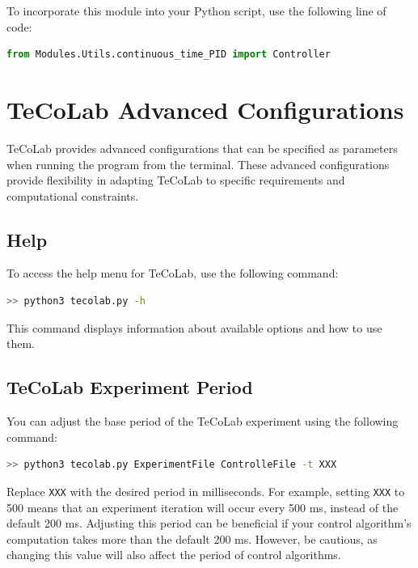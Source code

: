 \documentclass[12pt]{report}
\begin{document}
To incorporate this module into your Python script, use the following line of code:

\begin{lstlisting}[language = Python]
from Modules.Utils.continuous_time_PID import Controller
\end{lstlisting}

\chapter{TeCoLab Advanced Configurations}\label{chap:AdvancedConfigs}

TeCoLab provides advanced configurations that can be specified as parameters when running the program from the terminal. These advanced configurations provide flexibility in adapting TeCoLab to specific requirements and computational constraints.

\section{Help}

To access the help menu for TeCoLab, use the following command:

\begin{lstlisting}[language = bash]
>> python3 tecolab.py -h
\end{lstlisting}

This command displays information about available options and how to use them.

\section{TeCoLab Experiment Period}\label{sec:TeCoLabPeriod}

You can adjust the base period of the TeCoLab experiment using the following command:

\begin{lstlisting}[language = bash]
>> python3 tecolab.py ExperimentFile ControlleFile -t XXX
\end{lstlisting}

Replace \texttt{XXX} with the desired period in milliseconds. For example, setting \texttt{XXX} to 500 means that an experiment iteration will occur every 500 ms, instead of the default 200 ms. Adjusting this period can be beneficial if your control algorithm's computation takes more than the default 200 ms. However, be cautious, as changing this value will also affect the period of control algorithms.
\end{document}
